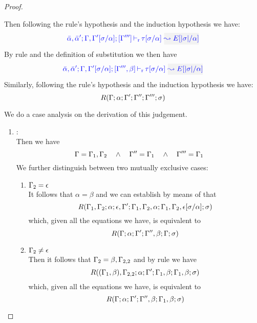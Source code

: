 \begin{proof}
\begin{description}
  Then following the rule's hypothesis and the induction hypothesis we have:
\begin{equation*}
  \dlres{\bar{\alpha},\bar{\alpha}'}{\tenv,\tenv'[\suty/\alpha]}{\tenv'''}{\type[\suty/\alpha]}{E[|\suty|/\alpha]}
\end{equation*}
  By rule  and the definition of substitution we then have
\begin{equation*}
  \dlres{\bar{\alpha},\bar{\alpha}'}{\tenv,\tenv'[\suty/\alpha]}{\tenv''',\beta}{\type[\suty/\alpha]}{E[|\suty|/\alpha]}
\end{equation*}
  Similarly, following the rule's hypothesis and the induction hypothesis we have:
\begin{equation*}
  R(\Gamma;\alpha;\Gamma';\Gamma'';\Gamma''';\sigma)
\end{equation*}

  We do a case analysis on the derivation of this judgement.
  \begin{enumerate}
  \item {}: \\ Then we have
\begin{equation*}
  \Gamma = \Gamma_1,\Gamma_2 \quad\wedge\quad \Gamma'' = \Gamma_1 \quad\wedge\quad \Gamma''' = \Gamma_1
\end{equation*}
  We further distinguish between two mutually exclusive cases:
  \begin{enumerate}
  \item $\Gamma_2 = \epsilon$ \\
        It follows that $\alpha = \beta$ and we can establish by means of  that
\begin{equation*}
R(\Gamma_1,\Gamma_2;\alpha;\epsilon,\Gamma';\Gamma_1,\Gamma_2,\alpha;\Gamma_1,\Gamma_2,\epsilon[\sigma/\alpha];\sigma)
\end{equation*}
        which, given all the equations we have, is equivalent to
\begin{equation*}
R(\Gamma;\alpha;\Gamma';\Gamma'',\beta;\Gamma;\sigma)
\end{equation*}

  \item $\Gamma_2 \neq \epsilon$ \\
       Then it follows that $\Gamma_2 = \beta,\Gamma_{2,2}$ and by rule  we have
\begin{equation*}
R((\Gamma_1,\beta),\Gamma_{2,2};\alpha;\Gamma';\Gamma_1,\beta;\Gamma_1,\beta;\sigma)
\end{equation*}
        which, given all the equations we have, is equivalent to
\begin{equation*}
R(\Gamma;\alpha;\Gamma';\Gamma'',\beta;\Gamma_1,\beta;\sigma)
\end{equation*}
  \end{enumerate}


\end{enumerate}
\end{description}
\end{proof}
